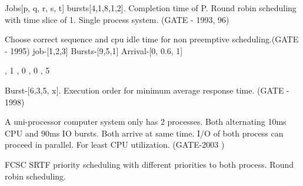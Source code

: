 

\begin{minipage}{\linewidth}

  \question Jobs[p, q, r, s, t] bursts[4,1,8,1,2]. Completion time of P. Round robin scheduling with time slice of 1.
            Single process system. (GATE - 1993, 96)

  \begin{choices}
  \end{choices}


\end{minipage}



\begin{minipage}{\linewidth}

  \question  Choose correct sequence and cpu idle time for non preemptive scheduling.(GATE - 1995)
             \newline job-[1,2,3] Bursts-[9,5,1] Arrival-[0, 0.6, 1]
  \begin{choices}
    , 1
    , 0
    , 0
    , 5
  \end{choices}

\end{minipage}



\begin{minipage}{\linewidth}

  \question  Burst-[6,3,5, x]. Execution order for minimum average response time. (GATE - 1998)


\end{minipage}



\begin{minipage}{\linewidth}

  \question  A uni-processor computer system only has 2 processes. Both alternating 10ms CPU and 90ms IO bursts.
             Both arrive at same time. I/O of both process can proceed in parallel. For least CPU utilization. (GATE-2003 )

  \begin{choices}
    \choice FCSC
    \choice SRTF
    \choice priority scheduling with different priorities to both process.
    \choice Round robin scheduling.
  \end{choices}


\end{minipage}

